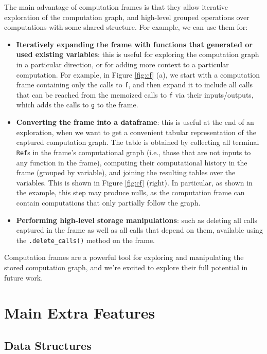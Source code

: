 \documentclass{article} %
\begin{document}
The main advantage of computation frames is that they allow iterative
exploration of the computation graph, and high-level grouped operations over
computations with some shared structure. For example, we can use them for:
\begin{itemize}
\item \textbf{Iteratively expanding the frame with functions that generated or
used existing variables}: this is useful for exploring the computation graph in
a particular direction, or for adding more context to a particular computation.
For example, in Figure \ref{fig:cf} (a), we start with a computation frame
containing only the calls to \texttt{f}, and then expand it to include all calls
that can be reached from the memoized calls to \texttt{f} via their
inputs/outputs, which adds the calls to \texttt{g} to the frame.
\item \textbf{Converting the frame into a dataframe}: this is useful at the end
of an exploration, when we want to get a convenient tabular representation of
the captured computation graph. The table is obtained by collecting all terminal
\texttt{Ref}s in the frame's computational graph (i.e., those that are not
inputs to any function in the frame), computing their computational history in
the frame (grouped by variable), and joining the resulting tables over the
variables. This is shown in Figure \ref{fig:cf} (right). In particular, as shown
in the example, this step may produce nulls, as the computation frame can
contain computations that only partially follow the graph.
\item \textbf{Performing high-level storage manipulations}: such as deleting all
calls captured in the frame as well as all calls that depend on them, available
using the \verb|.delete_calls()| method on the frame.
\end{itemize}

Computation frames are a powerful tool for exploring and manipulating the stored
computation graph, and we're excited to explore their full potential in future
work.

\section{Main Extra Features}
\label{section:extra-features}

\subsection{Data Structures}
\label{subsection:data-structures}
\end{document}
